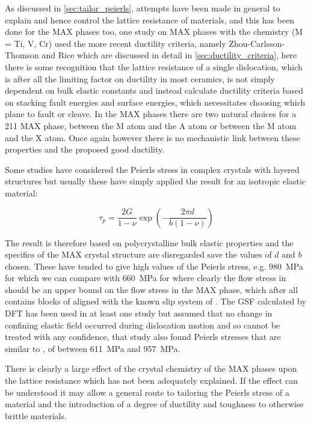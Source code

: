 As discussed in \autoref{sec:tailor_peierls}, attempts have been made in general to explain and hence control the lattice resistance of materials, and this has been done for the MAX phases too, one study on MAX phases \cite{Music2007ductility} with the chemistry  (M = Ti, V, Cr) used the more recent ductility criteria, namely Zhou-Carlsson-Thomson \cite{Zhou1994} and Rice \cite{Rice1992} which are discussed in detail in \autoref{sec:ductility_criteria}, here there is some recognition that the lattice resistance of a single dislocation, which is after all the limiting factor on ductility in most ceramics, is not simply dependent on bulk elastic constants and instead calculate ductility criteria based on stacking fault energies and surface energies, which necessitates choosing which plane to fault or cleave. In the MAX phases there are two natural choices for a 211 MAX phase, between the M atom and the A atom or between the M atom and the X atom. Once again however there is no mechanistic link between these properties and the proposed good ductility. 

Some studies have considered the Peierls stress in complex crystals with layered structures \cite{Music2008,Emmerlich2009,Gouriet2015} but usually these have simply applied the result for an isotropic elastic material:

\begin{equation}
\tau_p = \frac{2G}{1-\nu} \exp \left( - \frac{2 \pi d}{b(1-\nu)} \right)
\end{equation}

The result is therefore based on polycrystalline bulk elastic properties and the specifics of the MAX crystal structure are disregarded save the values of $d$ and $b$ chosen. These have tended to give high values of the Peierls stress, e.g. \SI{980}{\mega\pascal} for  \cite{Music2008} which we can compare with \SI{660}{\mega\pascal} for  \cite{Clegg2006} where clearly the flow stress in  should be an upper bound on the flow stress in the MAX phase, which after all contains blocks of  aligned with the known slip system of  \cite{Hollox1966}. The GSF calculated by DFT has been used in at least one study \cite{Gouriet2015} but assumed that no change in confining elastic field occurred during dislocation motion and so cannot be treated with any confidence, that study also found Peierls stresses that are similar to , of between \SI{611}{\mega\pascal} and \SI{957}{\mega\pascal}.

There is clearly a large effect of the crystal chemistry of the MAX phases upon the lattice resistance which has not been adequately explained. If the effect can be understood it may allow a general route to tailoring the Peierls stress of a material and the introduction of a degree of ductility and toughness to otherwise brittle materials.


